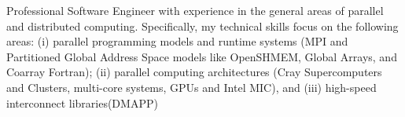Professional Software Engineer with experience in the general areas of parallel and
distributed computing. Specifically, my technical skills focus on the following areas:
(i)   parallel programming models and runtime systems (MPI and Partitioned Global
      Address Space models like OpenSHMEM, Global Arrays, and Coarray Fortran);
(ii)  parallel computing architectures (Cray Supercomputers and Clusters, multi-core
      systems, GPUs and Intel MIC), and
(iii) high-speed interconnect libraries(DMAPP)
